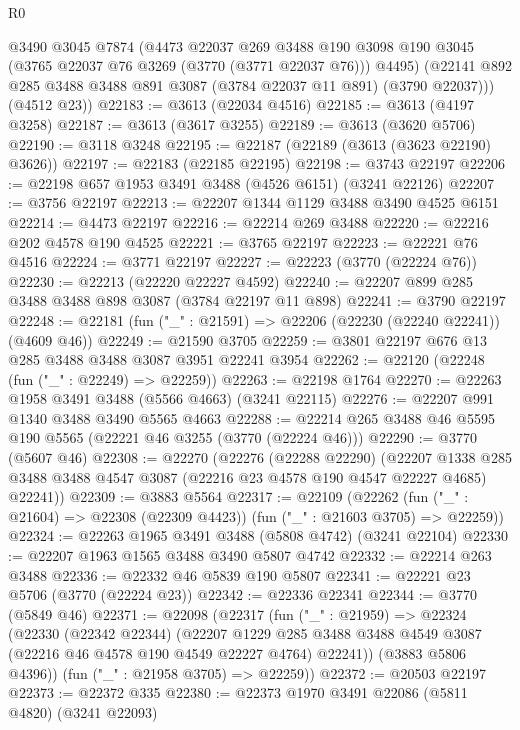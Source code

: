 \begin{lexlean}{R0}
\begin{coremodule}
        @3490
        @3045
        @7874
        (@4473
          @22037
          @269
          @3488
          @190
          @3098
          @190
          @3045
          (@3765 @22037 @76 @3269 (@3770 (@3771 @22037 @76)))
          @4495)
        (@22141 @892 @285 @3488 @3488 @891 @3087 (@3784 @22037 @11 @891) (@3790 @22037)))
      (@4512 @23))
@22183 := @3613 (@22034 @4516)
@22185 := @3613 (@4197 @3258)
@22187 := @3613 (@3617 @3255)
@22189 := @3613 (@3620 @5706)
@22190 := @3118 @3248
@22195 := @22187 (@22189 (@3613 (@3623 @22190) @3626))
@22197 := @22183 (@22185 @22195)
@22198 := @3743 @22197
@22206 := @22198 @657 @1953 @3491 @3488 (@4526 @6151) (@3241 @22126)
@22207 := @3756 @22197
@22213 := @22207 @1344 @1129 @3488 @3490 @4525 @6151
@22214 := @4473 @22197
@22216 := @22214 @269 @3488
@22220 := @22216 @202 @4578 @190 @4525
@22221 := @3765 @22197
@22223 := @22221 @76 @4516
@22224 := @3771 @22197
@22227 := @22223 (@3770 (@22224 @76))
@22230 := @22213 (@22220 @22227 @4592)
@22240 := @22207 @899 @285 @3488 @3488 @898 @3087 (@3784 @22197 @11 @898)
@22241 := @3790 @22197
@22248 := @22181 (fun ("_" : @21591) => @22206 (@22230 (@22240 @22241)) (@4609 @46))
@22249 := @21590 @3705
@22259 := @3801 @22197 @676 @13 @285 @3488 @3488 @3087 @3951 @22241 @3954
@22262 := @22120 (@22248 (fun ("_" : @22249) => @22259))
@22263 := @22198 @1764
@22270 := @22263 @1958 @3491 @3488 (@5566 @4663) (@3241 @22115)
@22276 := @22207 @991 @1340 @3488 @3490 @5565 @4663
@22288 := @22214 @265 @3488 @46 @5595 @190 @5565 (@22221 @46 @3255 (@3770 (@22224 @46)))
@22290 := @3770 (@5607 @46)
@22308 := @22270
    (@22276
      (@22288 @22290)
      (@22207 @1338 @285 @3488 @3488 @4547 @3087 (@22216 @23 @4578 @190 @4547 @22227 @4685) @22241))
@22309 := @3883 @5564
@22317 := @22109
    (@22262 (fun ("_" : @21604) => @22308 (@22309 @4423)) (fun ("_" : @21603 @3705) => @22259))
@22324 := @22263 @1965 @3491 @3488 (@5808 @4742) (@3241 @22104)
@22330 := @22207 @1963 @1565 @3488 @3490 @5807 @4742
@22332 := @22214 @263 @3488
@22336 := @22332 @46 @5839 @190 @5807
@22341 := @22221 @23 @5706 (@3770 (@22224 @23))
@22342 := @22336 @22341
@22344 := @3770 (@5849 @46)
@22371 := @22098
    (@22317
      (fun ("_" : @21959) =>
      @22324
        (@22330
          (@22342 @22344)
          (@22207
            @1229
            @285
            @3488
            @3488
            @4549
            @3087
            (@22216 @46 @4578 @190 @4549 @22227 @4764)
            @22241))
        (@3883 @5806 @4396))
      (fun ("_" : @21958 @3705) => @22259))
@22372 := @20503 @22197
@22373 := @22372 @335
@22380 := @22373 @1970 @3491 @22086 (@5811 @4820) (@3241 @22093)

\end{coremodule}
\end{lexlean}
